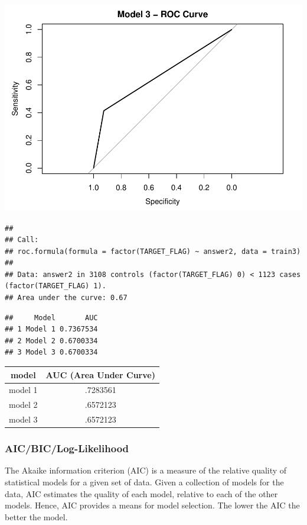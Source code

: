 \documentclass[]{article}
\begin{document}
\includegraphics{DATA621-Homework-4_files/figure-latex/unnamed-chunk-26-3.pdf}

\begin{verbatim}
## 
## Call:
## roc.formula(formula = factor(TARGET_FLAG) ~ answer2, data = train3)
## 
## Data: answer2 in 3108 controls (factor(TARGET_FLAG) 0) < 1123 cases (factor(TARGET_FLAG) 1).
## Area under the curve: 0.67
\end{verbatim}

\begin{verbatim}
##     Model       AUC
## 1 Model 1 0.7367534
## 2 Model 2 0.6700334
## 3 Model 3 0.6700334
\end{verbatim}

\begin{tabular}{ c | c |}
model & AUC (Area Under Curve)  \\
\hline
model 1 & .7283561 \\
\hline
model 2 & .6572123 \\
\hline
model 3 & .6572123 \\
\end{tabular}

\subsubsection{AIC/BIC/Log-Likelihood}\label{aicbiclog-likelihood}

The Akaike information criterion (AIC) is a measure of the relative
quality of statistical models for a given set of data. Given a
collection of models for the data, AIC estimates the quality of each
model, relative to each of the other models. Hence, AIC provides a means
for model selection. The lower the AIC the better the model.
\end{document}
